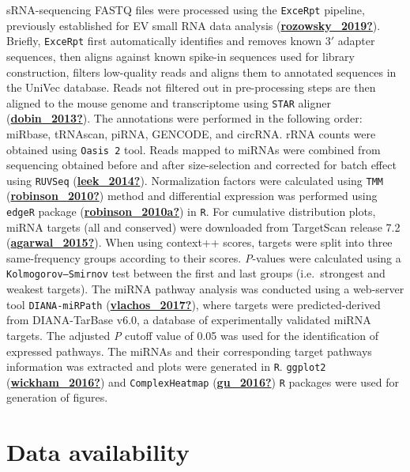 \documentclass[12pt,twoside]{reedthesis}
\begin{document}
sRNA-sequencing FASTQ files were processed using the \texttt{ExceRpt} pipeline,
previously established for EV small RNA data analysis (\protect\hyperlink{ref-rozowsky_2019}{\textbf{rozowsky\_2019?}}).
Briefly, \texttt{ExceRpt} first automatically identifies and removes known 3\('\)
adapter sequences, then aligns against known spike-in sequences used for
library construction, filters low-quality reads and aligns them to
annotated sequences in the UniVec database. Reads not filtered out in
pre-processing steps are then aligned to the mouse genome and
transcriptome using \texttt{STAR} aligner (\protect\hyperlink{ref-dobin_2013}{\textbf{dobin\_2013?}}). The annotations were
performed in the following order: miRbase, tRNAscan, piRNA, GENCODE, and
circRNA. rRNA counts were obtained using \texttt{Oasis\ 2} tool. Reads mapped to
miRNAs were combined from sequencing obtained before and after
size-selection and corrected for batch effect using \texttt{RUVSeq}
(\protect\hyperlink{ref-leek_2014}{\textbf{leek\_2014?}}). Normalization factors were calculated using \texttt{TMM}
(\protect\hyperlink{ref-robinson_2010}{\textbf{robinson\_2010?}}) method and differential expression was performed using
\texttt{edgeR} package (\protect\hyperlink{ref-robinson_2010a}{\textbf{robinson\_2010a?}}) in \texttt{R}. For cumulative distribution
plots, miRNA targets (all and conserved) were downloaded from TargetScan
release 7.2 (\protect\hyperlink{ref-agarwal_2015}{\textbf{agarwal\_2015?}}). When using context++ scores, targets were
split into three same-frequency groups according to their scores.
\textit{P}-values were calculated using a \texttt{Kolmogorov–Smirnov} test
between the first and last groups (i.e.~strongest and weakest targets).
The miRNA pathway analysis was conducted using a web-server tool
\texttt{DIANA-miRPath} (\protect\hyperlink{ref-vlachos_2017}{\textbf{vlachos\_2017?}}), where targets were predicted-derived
from DIANA-TarBase v6.0, a database of experimentally validated miRNA
targets. The adjusted \textit{P} cutoff value of 0.05 was used for the
identification of expressed pathways. The miRNAs and their corresponding
target pathways information was extracted and plots were generated in
\texttt{R}. \texttt{ggplot2} (\protect\hyperlink{ref-wickham_2016}{\textbf{wickham\_2016?}}) and \texttt{ComplexHeatmap} (\protect\hyperlink{ref-gu_2016}{\textbf{gu\_2016?}}) \texttt{R}
packages were used for generation of figures.

\hypertarget{data-availability}{%
\section{Data availability}\label{data-availability}}
\end{document}
